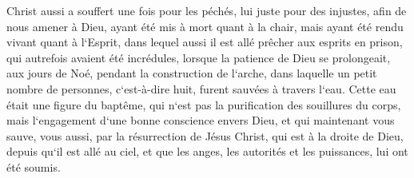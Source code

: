 \verse Christ aussi a souffert une fois pour les péchés, lui juste pour des injustes, afin de nous amener à Dieu, ayant été mis à mort quant à la chair, mais ayant été rendu vivant quant à l`Esprit, 
\verse dans lequel aussi il est allé prêcher aux esprits en prison, 
\verse qui autrefois avaient été incrédules, lorsque la patience de Dieu se prolongeait, aux jours de Noé, pendant la construction de l`arche, dans laquelle un petit nombre de personnes, c`est-à-dire huit, furent sauvées à travers l`eau. 
\verse Cette eau était une figure du baptême, qui n`est pas la purification des souillures du corps, mais l`engagement d`une bonne conscience envers Dieu, et qui maintenant vous sauve, vous aussi, par la résurrection de Jésus Christ, 
\verse qui est à la droite de Dieu, depuis qu`il est allé au ciel, et que les anges, les autorités et les puissances, lui ont été soumis. 

